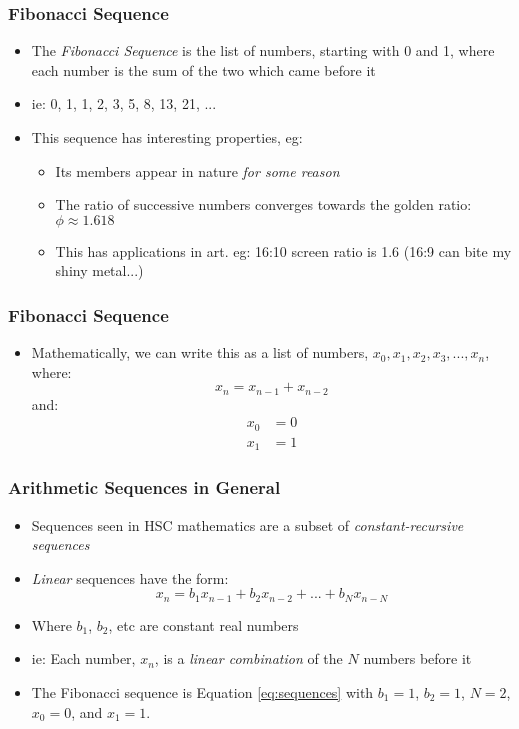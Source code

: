 \documentclass[14pt]{beamer}
\begin{document}
\begin{frame}
\frametitle{Fibonacci Sequence}
\begin{itemize}
\item The \textit{Fibonacci Sequence} is the list of numbers, starting with 0 and 1, where each number is the sum of the two which came before it

\item ie: 0, 1, 1, 2, 3, 5, 8, 13, 21, ...

\item This sequence has interesting properties, eg:
	\begin{itemize}
		\item Its members appear in nature \textit{for some reason}
		\item The ratio of successive numbers converges towards the golden ratio: $\phi \approx 1.618$
		\item This has applications in art. eg: 16:10 screen ratio is 1.6 (16:9 can bite my shiny metal...)
	\end{itemize}
\end{itemize}
\end{frame}

\begin{frame}
\frametitle{Fibonacci Sequence}
\begin{itemize}
\item Mathematically, we can write this as a list of numbers, $x_0,x_1, x_2, x_3, ... , x_n$, where:
\begin{equation}
x_n = x_{n-1} + x_{n-2}
\end{equation}
and:
\begin{align}
x_0 &= 0\\
x_1 &= 1
\end{align}
\end{itemize}
\end{frame}

\begin{frame}
\frametitle{Arithmetic Sequences in General}
\begin{itemize}
\item Sequences seen in HSC mathematics are a subset of \textit{constant-recursive sequences}
\item \textit{Linear} sequences have the form:
\begin{equation}\label{eq:sequences}
x_n = b_1x_{n-1} + b_2x_{n-2} + ... + b_Nx_{n-N}
\end{equation}
\item Where $b_1$, $b_2$, etc are constant real numbers
\item ie: Each number, $x_n$, is a \textit{linear combination} of the $N$ numbers before it
\item The Fibonacci sequence is Equation \eqref{eq:sequences} with $b_1 = 1$, $b_2 = 1$, $N = 2$, $x_0 = 0$, and $x_1 = 1$.
\end{itemize}
\end{frame}
\end{document}
